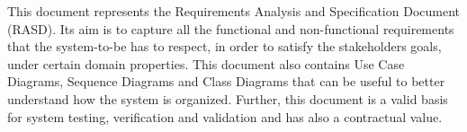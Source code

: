 This document represents the Requirements Analysis and Specification Document (RASD).
Its aim is to capture all the functional and non-functional requirements that the system-to-be has to respect, in order to satisfy the stakeholders goals, under certain domain properties. This document also contains Use Case Diagrams, Sequence Diagrams and Class Diagrams that can be useful to better understand how the system is organized. 
\newline
Further, this document is a valid basis for system testing, verification and validation and has also a contractual value.